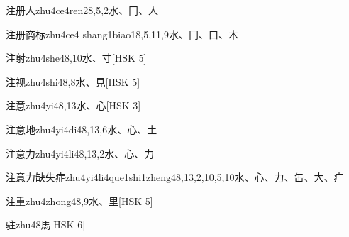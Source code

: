 \begin{EntryWithPhonetic}{注册人}{zhu4ce4ren2}{8,5,2}{⽔、⼌、⼈}
\end{EntryWithPhonetic}

\begin{EntryWithPhonetic}{注册商标}{zhu4ce4 shang1biao1}{8,5,11,9}{⽔、⼌、⼝、⽊}
\end{EntryWithPhonetic}

\begin{EntryWithPhonetic}{注射}{zhu4she4}{8,10}{⽔、⼨}[HSK 5]
\end{EntryWithPhonetic}

\begin{EntryWithPhonetic}{注视}{zhu4shi4}{8,8}{⽔、⾒}[HSK 5]
\end{EntryWithPhonetic}

\begin{EntryWithPhonetic}{注意}{zhu4yi4}{8,13}{⽔、⼼}[HSK 3]
\end{EntryWithPhonetic}

\begin{EntryWithPhonetic}{注意地}{zhu4yi4di4}{8,13,6}{⽔、⼼、⼟}
\end{EntryWithPhonetic}

\begin{EntryWithPhonetic}{注意力}{zhu4yi4li4}{8,13,2}{⽔、⼼、⼒}
\end{EntryWithPhonetic}

\begin{EntryWithPhonetic}{注意力缺失症}{zhu4yi4li4que1shi1zheng4}{8,13,2,10,5,10}{⽔、⼼、⼒、⽸、⼤、⽧}
\end{EntryWithPhonetic}

\begin{EntryWithPhonetic}{注重}{zhu4zhong4}{8,9}{⽔、⾥}[HSK 5]
\end{EntryWithPhonetic}

\begin{EntryWithPhonetic}{驻}{zhu4}{8}{⾺}[HSK 6]
\end{EntryWithPhonetic}

